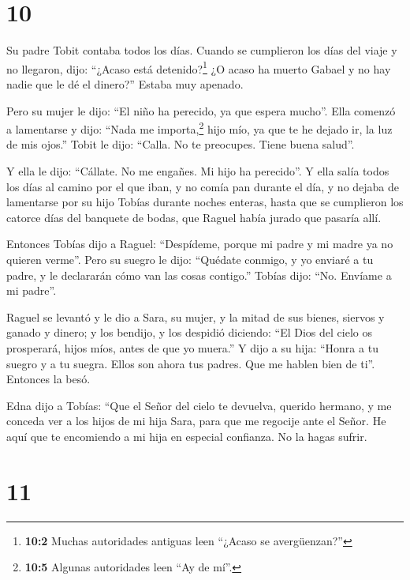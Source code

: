 \hypertarget{section-9}{%
\section{10}\label{section-9}}

 Su padre Tobit contaba todos los días. Cuando se
cumplieron los días del viaje y no llegaron,  dijo:
``¿Acaso está detenido?\footnote{\textbf{10:2} Muchas autoridades
  antiguas leen ``¿Acaso se avergüenzan?''} ¿O acaso ha muerto Gabael y
no hay nadie que le dé el dinero?''  Estaba muy apenado.

 Pero su mujer le dijo: ``El niño ha perecido, ya que
espera mucho''. Ella comenzó a lamentarse y dijo:  ``Nada
me importa,\footnote{\textbf{10:5} Algunas autoridades leen ``Ay de
  mí''.} hijo mío, ya que te he dejado ir, la luz de mis ojos.''
 Tobit le dijo: ``Calla. No te preocupes. Tiene buena
salud''.

 Y ella le dijo: ``Cállate. No me engañes. Mi hijo ha
perecido''. Y ella salía todos los días al camino por el que iban, y no
comía pan durante el día, y no dejaba de lamentarse por su hijo Tobías
durante noches enteras, hasta que se cumplieron los catorce días del
banquete de bodas, que Raguel había jurado que pasaría allí.

Entonces Tobías dijo a Raguel: ``Despídeme, porque mi padre y mi madre
ya no quieren verme''.  Pero su suegro le dijo: ``Quédate
conmigo, y yo enviaré a tu padre, y le declararán cómo van las cosas
contigo.''  Tobías dijo: ``No. Envíame a mi padre''.

 Raguel se levantó y le dio a Sara, su mujer, y la mitad
de sus bienes, siervos y ganado y dinero;  y los bendijo,
y los despidió diciendo: ``El Dios del cielo os prosperará, hijos míos,
antes de que yo muera.''  Y dijo a su hija: ``Honra a tu
suegro y a tu suegra. Ellos son ahora tus padres. Que me hablen bien de
ti''. Entonces la besó.

Edna dijo a Tobías: ``Que el Señor del cielo te devuelva, querido
hermano, y me conceda ver a los hijos de mi hija Sara, para que me
regocije ante el Señor. He aquí que te encomiendo a mi hija en especial
confianza. No la hagas sufrir.

\hypertarget{section-10}{%
\section{11}\label{section-10}}

